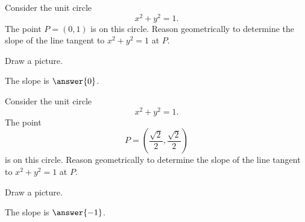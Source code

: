 \documentclass{ximera}
\begin{document}
\begin{problem}
  Consider the unit circle
  \[
  x^2 + y^2 = 1.
  \]
  The point $P=(0,1)$ is on this circle. Reason geometrically to
  determine the slope of the line tangent to $x^2 + y^2 = 1$ at
  $P$.
  \begin{hint}
    Draw a picture.
  \end{hint}
  \begin{prompt}
    The slope is $\answer{0}$.
  \end{prompt}
\end{problem}

\begin{problem}
  Consider the unit circle
  \[
  x^2 + y^2 = 1.
  \]
  The point
  \[
  P=\left(\frac{\sqrt{2}}{2},\frac{\sqrt{2}}{2}\right)
  \]
  is on this circle. Reason geometrically to determine the slope of
  the line tangent to $x^2 + y^2 = 1$ at $P$.
  \begin{hint}
    Draw a picture.
  \end{hint}
  \begin{prompt}
    The slope is $\answer{-1}$.
  \end{prompt}
\end{problem}





\end{document}
